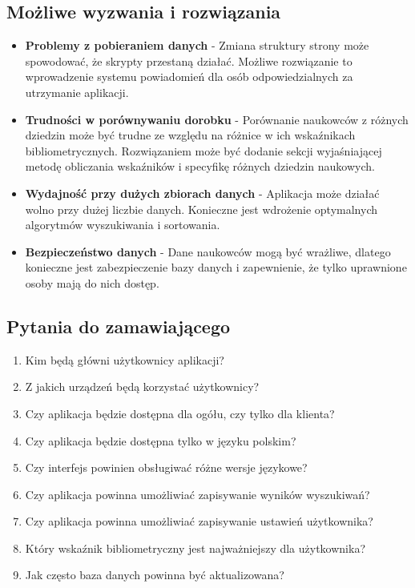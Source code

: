 \documentclass{article}
\begin{document}
\subsection{Możliwe wyzwania i rozwiązania}
\begin{itemize}
  \item \textbf{Problemy z pobieraniem danych} - Zmiana struktury strony może spowodować, że skrypty przestaną działać. Możliwe rozwiązanie to wprowadzenie systemu powiadomień dla osób odpowiedzialnych za utrzymanie aplikacji.
  \item \textbf{Trudności w porównywaniu dorobku} - Porównanie naukowców z różnych dziedzin może być trudne ze względu na różnice w ich wskaźnikach bibliometrycznych. Rozwiązaniem może być dodanie sekcji wyjaśniającej metodę obliczania wskaźników i specyfikę różnych dziedzin naukowych.
  \item \textbf{Wydajność przy dużych zbiorach danych} - Aplikacja może działać wolno przy dużej liczbie danych. Konieczne jest wdrożenie optymalnych algorytmów wyszukiwania i sortowania.
  \item \textbf{Bezpieczeństwo danych} - Dane naukowców mogą być wrażliwe, dlatego konieczne jest zabezpieczenie bazy danych i zapewnienie, że tylko uprawnione osoby mają do nich dostęp.
\end{itemize}

\subsection{Pytania do zamawiającego}
\begin{enumerate}
  \item Kim będą główni użytkownicy aplikacji?
  \item Z jakich urządzeń będą korzystać użytkownicy?
  \item Czy aplikacja będzie dostępna dla ogółu, czy tylko dla klienta?
  \item Czy aplikacja będzie dostępna tylko w języku polskim?
  \item Czy interfejs powinien obsługiwać różne wersje językowe?
  \item Czy aplikacja powinna umożliwiać zapisywanie wyników wyszukiwań?
  \item Czy aplikacja powinna umożliwiać zapisywanie ustawień użytkownika?
  \item Który wskaźnik bibliometryczny jest najważniejszy dla użytkownika?
  \item Jak często baza danych powinna być aktualizowana?
\end{enumerate}
\end{document}
